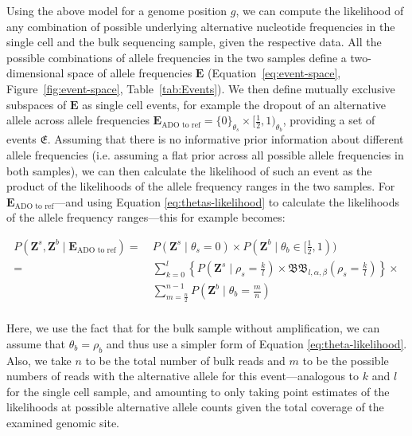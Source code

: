 \documentclass[authoryear,preprint,11pt]{scrartcl}
\newcommand{\Prob}{{P}}
\newcommand{\cB}{{\mathfrak B}}
\begin{document}
Using the above model for a genome position $g$, we can compute the likelihood of any combination of possible underlying alternative nucleotide frequencies in the single cell and the bulk sequencing sample, given the respective data.
All the possible combinations of allele frequencies in the two samples define a two-dimensional space of allele frequencies $\boldsymbol{E}$ (Equation~\ref{eq:event-space}, Figure~\ref{fig:event-space}, Table~\ref{tab:Events}).
We then define mutually exclusive subspaces of $\boldsymbol{E}$ as single cell events, for example the dropout of an alternative allele across allele frequencies $\boldsymbol{E}_{\text{ADO to ref}} = \{ 0 \}_{\theta_s} \times [\frac{1}{2}, 1)_{\theta_b}$, providing a set of events $\mathfrak{E}$.
Assuming that there is no informative prior information about different allele frequencies (i.e. assuming a flat prior across all possible allele frequencies in both samples), we can then calculate the likelihood of such an event as the product of the likelihoods of the allele frequency ranges in the two samples.
For $\boldsymbol{E}_{\text{ADO to ref}}$---and using Equation \ref{eq:thetas-likelihood} to calculate the likelihoods of the allele frequency ranges---this for example becomes:

\begin{equation}
  \label{eq:ado-to-ref-likelihood-samples}
  \begin{split}
    \Prob(\boldsymbol{Z}^s,\boldsymbol{Z}^b \mid \boldsymbol{E}_{\text{ADO to ref}})
      =~&\Prob(\boldsymbol{Z}^s \mid \theta_s = 0) \times \Prob(\boldsymbol{Z}^b \mid \theta_b \in [\frac12,1))\\
      =~&\sum_{k=0}^{l} \left\{ \Prob(\boldsymbol{Z}^s \mid \rho_s = \frac{k}{l}) \times \cB\cB_{l,\alpha, \beta} (\rho_s = \frac{k}{l}) \right\} \times\\
        &\sum_{m=\frac{n}{2}}^{n-1} \Prob(\boldsymbol{Z}^b \mid \theta_b = \frac{m}{n})\\
  \end{split}
\end{equation}

Here, we use the fact that for the bulk sample without amplification, we can assume that $\theta_b = \rho_b$ and thus use a simpler form of Equation \ref{eq:theta-likelihood}.
Also, we take $n$ to be the total number of bulk reads and $m$ to be the possible numbers of reads with the alternative allele for this event---analogous to $k$ and $l$ for the single cell sample, and amounting to only taking point estimates of the likelihoods at possible alternative allele counts given the total coverage of the examined genomic site.
\end{document}
